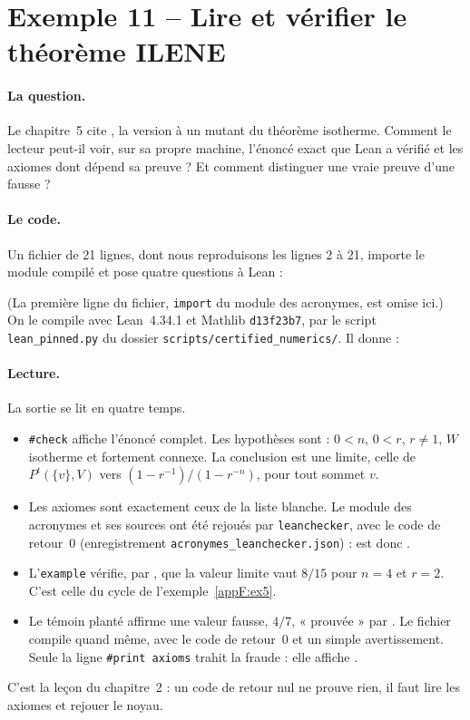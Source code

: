 \section{Exemple 11 -- Lire et vérifier le théorème ILENE}\label{appF:ex11}

\paragraph{La question.} Le chapitre~5 cite , la version à un mutant du théorème isotherme. Comment le
lecteur peut-il voir, sur sa propre machine, l'énoncé exact que Lean a vérifié et les axiomes dont dépend sa preuve ?
Et comment distinguer une vraie preuve d'une fausse ?

\paragraph{Le code.} Un fichier de 21 lignes, dont nous reproduisons les lignes 2 à 21, importe le module compilé et pose quatre questions à Lean :

(La première ligne du fichier, \texttt{import} du module des acronymes, est omise ici.)
On le compile avec Lean~4.34.1 et Mathlib \texttt{d13f23b7}, par le script \texttt{lean\_pinned.py} du
dossier \texttt{scripts/certified\_numerics/}. Il donne :

\paragraph{Lecture.} La sortie se lit en quatre temps.
\begin{itemize}
\item \texttt{\#check} affiche l'énoncé complet. Les hypothèses sont : $0<n$, $0<r$, $r\ne1$, $W$ isotherme et fortement
connexe. La conclusion est une limite, celle de $P^t(\{v\},V)$ vers $(1-r^{-1})/(1-r^{-n})$, pour tout sommet $v$.
\item Les axiomes sont exactement ceux de la liste blanche. Le module des acronymes et ses sources ont été rejoués
par \texttt{leanchecker}, avec le code de retour~0 (enregistrement \texttt{acronymes\_leanchecker.json}) :
 est donc \tierA.
\item L'\texttt{example} vérifie, par , que la valeur limite vaut $8/15$ pour $n=4$ et $r=2$. C'est
celle du cycle de l'exemple~\ref{appF:ex5}.
\item Le témoin planté affirme une valeur fausse, $4/7$, « prouvée » par . Le fichier compile quand même,
avec le code de retour~0 et un simple avertissement. Seule la ligne \texttt{\#print axioms} trahit la fraude : elle
affiche .
\end{itemize}
C'est la leçon du chapitre~2 : un code de retour nul ne prouve rien, il faut lire les axiomes et rejouer le noyau.

